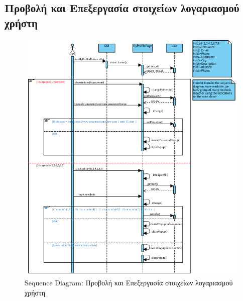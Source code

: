 \documentclass[12pt,a4paper]{article}
\begin{document}
\subsection{Προβολή και Επεξεργασία στοιχείων λογαριασμού χρήστη}
\begin{figure}[H]
	\includegraphics[width=\textwidth]{View and Edit User Account Details Sequence.png}
	\caption{Sequence Diagram: Προβολή και Επεξεργασία στοιχείων λογαριασμού χρήστη}
	\label{Sequence Diagram: Προβολή και Επεξεργασία στοιχείων λογαριασμού χρήστη}
\end{figure}
\end{document}
